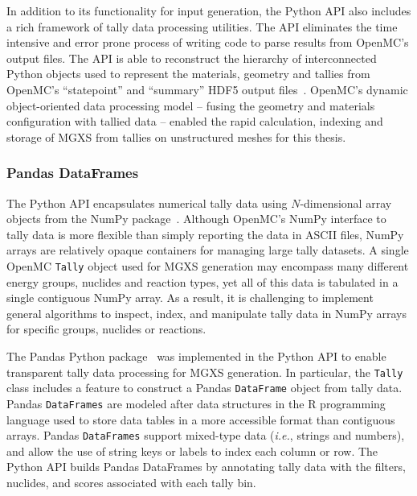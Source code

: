 In addition to its functionality for input generation, the Python \ac{API} also includes a rich framework of tally data processing utilities. The \ac{API} eliminates the time intensive and error prone process of writing code to parse results from OpenMC's output files. The \ac{API} is able to reconstruct the hierarchy of interconnected Python objects used to represent the materials, geometry and tallies from OpenMC's ``statepoint'' and ``summary'' \ac{HDF5} output files~\cite{koranne2011hdf5}. OpenMC's dynamic object-oriented data processing model -- fusing the geometry and materials configuration with tallied data -- enabled the rapid calculation, indexing and storage of \ac{MGXS} from tallies on unstructured meshes for this thesis.
  
\subsubsection{Pandas DataFrames}
\label{subsubsec:chap4-pandas-df}

The Python API encapsulates numerical tally data using $N$-dimensional array objects from the NumPy package~\cite{walt2011numpy}. Although OpenMC's NumPy interface to tally data is more flexible than simply reporting the data in \ac{ASCII} files, NumPy arrays are relatively opaque containers for managing large tally datasets. A single OpenMC \texttt{Tally} object used for \ac{MGXS} generation may encompass many different energy groups, nuclides and reaction types, yet all of this data is tabulated in a single contiguous NumPy array. As a result, it is challenging to implement general algorithms to inspect, index, and manipulate tally data in NumPy arrays for specific groups, nuclides or reactions.

The Pandas Python package~\cite{mckinney2010pandas} was implemented in the Python \ac{API} to enable transparent tally data processing for \ac{MGXS} generation. In particular, the \texttt{Tally} class includes a feature to construct a Pandas 
\texttt{DataFrame} object from tally data. Pandas \texttt{DataFrames} are modeled after data structures in the \textsf{R} programming language used to store data tables in a more accessible format than contiguous arrays. Pandas \texttt{DataFrames} support mixed-type data (\textit{i.e.}, strings and numbers), and allow the use of string keys or labels to index each column or row. The Python \ac{API} builds Pandas DataFrames by annotating tally data with the filters, nuclides, and scores associated with each tally bin. 

